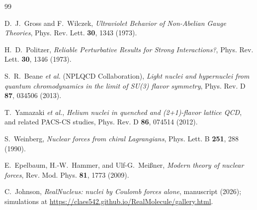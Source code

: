 \documentclass[11pt]{article}
\begin{document}
\begin{thebibliography}{99}

 D.~J.~Gross and F.~Wilczek,
\emph{Ultraviolet Behavior of Non-Abelian Gauge Theories},
Phys. Rev. Lett. \textbf{30}, 1343 (1973).

 H.~D.~Politzer,
\emph{Reliable Perturbative Results for Strong Interactions?},
Phys. Rev. Lett. \textbf{30}, 1346 (1973).

 S.~R.~Beane \emph{et al.} (NPLQCD Collaboration),
\emph{Light nuclei and hypernuclei from quantum chromodynamics in the limit of SU(3) flavor symmetry},
Phys. Rev. D \textbf{87}, 034506 (2013).

 T.~Yamazaki \emph{et al.},
\emph{Helium nuclei in quenched and (2+1)-flavor lattice QCD}, and related PACS-CS studies,
Phys. Rev. D \textbf{86}, 074514 (2012).

 S.~Weinberg,
\emph{Nuclear forces from chiral Lagrangians},
Phys. Lett. B \textbf{251}, 288 (1990).

 E.~Epelbaum, H.-W.~Hammer, and Ulf-G.~Mei\ss ner,
\emph{Modern theory of nuclear forces},
Rev. Mod. Phys. \textbf{81}, 1773 (2009).

 C.~Johnson,
\emph{RealNucleus: nuclei by Coulomb forces alone},
manuscript (2026); simulations at \url{https://claes542.github.io/RealMolecule/gallery.html}.

\end{thebibliography}
\end{document}
